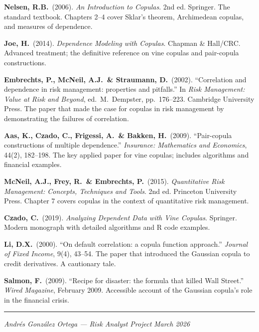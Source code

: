 \documentclass[11pt, a4paper]{article}
\theoremstyle{definition}
\theoremstyle{plain}
\theoremstyle{remark}
\begin{document}
\begin{enumerate}[label={[\arabic*]}, leftmargin=2cm]
    \item \textbf{Nelsen, R.B.}\ (2006).
          \emph{An Introduction to Copulas}. 2nd ed.
          Springer.
          The standard textbook.
          Chapters 2--4 cover Sklar's theorem, Archimedean copulas, and measures of dependence.

    \item \textbf{Joe, H.}\ (2014).
          \emph{Dependence Modeling with Copulas}.
          Chapman \& Hall/CRC.
          Advanced treatment; the definitive reference on vine copulas and pair-copula constructions.

    \item \textbf{Embrechts, P., McNeil, A.J.\ \& Straumann, D.}\ (2002).
          ``Correlation and dependence in risk management: properties and pitfalls.''
          In \emph{Risk Management: Value at Risk and Beyond}, ed.\ M.\ Dempster, pp.\ 176--223.
          Cambridge University Press.
          The paper that made the case for copulas in risk management by demonstrating
          the failures of correlation.

    \item \textbf{Aas, K., Czado, C., Frigessi, A.\ \& Bakken, H.}\ (2009).
          ``Pair-copula constructions of multiple dependence.''
          \emph{Insurance: Mathematics and Economics}, 44(2), 182--198.
          The key applied paper for vine copulas; includes algorithms and financial examples.

    \item \textbf{McNeil, A.J., Frey, R.\ \& Embrechts, P.}\ (2015).
          \emph{Quantitative Risk Management: Concepts, Techniques and Tools}. 2nd ed.
          Princeton University Press.
          Chapter 7 covers copulas in the context of quantitative risk management.

    \item \textbf{Czado, C.}\ (2019).
          \emph{Analyzing Dependent Data with Vine Copulas}.
          Springer.
          Modern monograph with detailed algorithms and R code examples.

    \item \textbf{Li, D.X.}\ (2000).
          ``On default correlation: a copula function approach.''
          \emph{Journal of Fixed Income}, 9(4), 43--54.
          The paper that introduced the Gaussian copula to credit derivatives.
          A cautionary tale.

    \item \textbf{Salmon, F.}\ (2009).
          ``Recipe for disaster: the formula that killed Wall Street.''
          \emph{Wired Magazine}, February 2009.
          Accessible account of the Gaussian copula's role in the financial crisis.
\end{enumerate}

\vfill
\hrule
\smallskip
\noindent\textit{Andr\'es Gonz\'alez Ortega --- Risk Analyst Project} \hfill \textit{March 2026}
\end{document}
